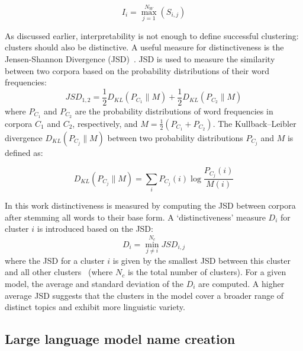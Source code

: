 \documentclass{article}
\begin{document}
\begin{equation}
{I_i = \max_{j=1}^{N_W}(S_{i,j})}
\label{eq:interpretability}
\end{equation}


As discussed earlier, interpretability is not enough to define successful clustering: clusters should also be distinctive.  
A useful measure for distinctiveness is the Jensen-Shannon Divergence (JSD)~\cite{lu2021diverging}.  
JSD is used to measure the similarity between two corpora based on the probability distributions of their word frequencies:
\begin{equation}
{JSD_{1,2} = \frac{1}{2} D_{KL}(P_{C_1} \parallel M) + \frac{1}{2} D_{KL}(P_{C_2} \parallel M)}
\label{eq:JSD}
\end{equation}
where \(P_{C_1}\) and \(P_{C_2}\) are the probability distributions of word frequencies in corpora \(C_1\) and \(C_2\), respectively, 
and \(M = \frac{1}{2}(P_{C_1} + P_{C_2})\).  
The Kullback--Leibler divergence \cite{kullbackInformationSufficiency1951} $D_{KL}(P_{C_j} \parallel M)$ between two probability distributions $P_{C_j}$ and $M$ is defined as:

\begin{equation}
D_{KL}(P_{C_j} \parallel M) = \sum_{i} P_{C_j}(i) \log \frac{P_{C_j}(i)}{M(i)}
\end{equation}

In this work distinctiveness is measured by computing the JSD between corpora after stemming all words to their base form.  
A `distinctiveness' measure $D_i$ for cluster $i$ is introduced based on the JSD:
\begin{equation}
{D_i = \min_{j \ne i}^{N_c}JSD_{i,j}}
\label{eq:distinctiveness}
\end{equation}
where the JSD for a cluster $i$ is given by the smallest JSD between this cluster and all other clusters~\cite{menendez1997jensen} (where $N_c$ is the total number of clusters).  
For a given model, the average and standard deviation of the $D_i$ are computed.  
A higher average JSD suggests that the clusters in the model cover a broader range of distinct topics and exhibit more linguistic variety.  

\subsection{Large language model name creation}
\end{document}
